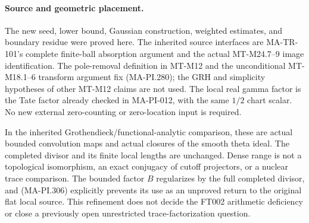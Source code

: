 \paragraph{Source and geometric placement.}
The new seed, lower bound, Gaussian construction,
weighted estimates, and boundary residue were
proved here.  The inherited source interfaces
are MA-TR-101's complete finite-ball absorption
argument and the actual MT-M24.7--9 image
identification.  The pole-removal definition
in MT-M12 and the unconditional MT-M18.1--6
transform argument fix (MA-PI.280); the GRH
and simplicity hypotheses of other MT-M12
claims are not used.  The local real gamma
factor is the Tate factor already checked in
MA-PI-012, with the same \(1/2\) chart scalar.
No new external zero-counting or zero-location
input is required.

In the inherited Grothendieck/functional-analytic
comparison, these are actual bounded convolution
maps and actual closures of the smooth theta
ideal.  The completed divisor and its finite
local lengths are unchanged.  Dense range is
not a topological isomorphism, an exact
conjugacy of cutoff projectors, or a nuclear
trace comparison.  The bounded factor \(B\)
regularizes by the full completed divisor,
and (MA-PI.306) explicitly prevents its use
as an unproved return to the original flat
local source.  This refinement does not decide
the FT002 arithmetic deficiency or close a
previously open unrestricted trace-factorization
question.
